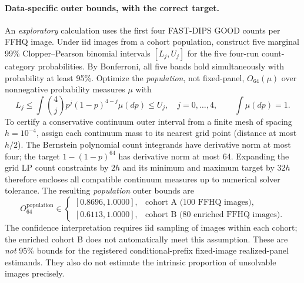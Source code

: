 \paragraph{Data-specific outer bounds, with the correct target.}
An \emph{exploratory} calculation uses the
first four FAST-DIPS GOOD counts per FFHQ image. Under iid images from a cohort population,
construct five marginal 99\% Clopper--Pearson binomial intervals
$[L_j,U_j]$ for the five four-run count-category probabilities.
By Bonferroni, all five bands hold simultaneously with probability
at least 95\%. Optimize the \emph{population}, not fixed-panel,
$O_{64}(\mu)$ over nonnegative probability measures $\mu$ with
\[
 L_j\le\int\binom4j p^j(1-p)^{4-j}\mu(dp)\le U_j,
 \quad j=0,\ldots,4,\qquad\int\mu(dp)=1.
\]
To certify a conservative continuum outer interval from a finite
mesh of spacing $h=10^{-4}$, assign each continuum mass to its
nearest grid point (distance at most $h/2$). The Bernstein
polynomial count integrands have derivative norm at most four;
the target $1-(1-p)^{64}$ has derivative norm at most 64.
Expanding the grid LP count constraints by $2h$ and its minimum and
maximum target by $32h$ therefore encloses all compatible
continuum measures up to numerical solver tolerance. The resulting
\emph{population} outer bounds are
\begin{equation}\label{eq:suppl-population-bounds}
 O_{64}^{\mathrm{population}}\in
 \begin{cases}
 [0.8696,1.0000],&\text{cohort A (100 FFHQ images)},\\
 [0.6113,1.0000],&\text{cohort B (80 enriched FFHQ images)}.
 \end{cases}
\end{equation}
The confidence interpretation requires iid sampling of images
within each cohort; the enriched cohort B does not automatically meet this assumption. These are
\emph{not} 95\% bounds for the registered conditional-prefix
fixed-image realized-panel estimands. They also do not estimate
the intrinsic proportion of unsolvable images precisely.

